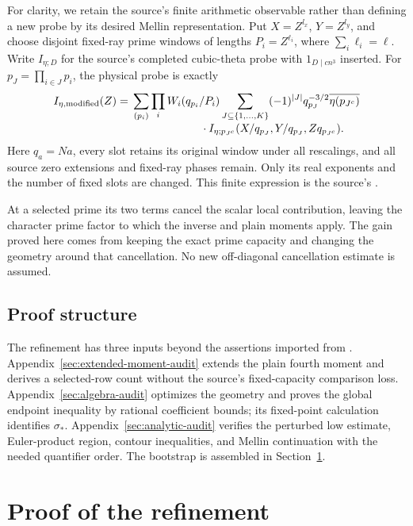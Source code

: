 \documentclass[11pt,a4paper]{article}
\numberwithin{equation}{section}
\theoremstyle{remark}
\newcommand{\src}[1]{\texttt{\detokenize{#1}}}
\begin{document}
For clarity, we retain the source's finite arithmetic observable rather
than defining a new probe by its desired Mellin representation. Put
$X=Z^{l_x}$, $Y=Z^{l_y}$, and choose disjoint fixed-ray prime windows
of lengths $P_i=Z^{\ell_i}$, where $\sum_i\ell_i=\ell$.
Write $I_{\eta;D}$ for the source's completed cubic-theta probe with
$1_{D\mid cn^3}$ inserted. For $p_J=\prod_{i\in J}p_i$, the physical
probe is exactly
\begin{align}
 I_{\eta,\mathrm{modified}}(Z)
 ={}&\sum_{(p_i)}\prod_i W_i(q_{p_i}/P_i)
 \sum_{J\subseteq\{1,\ldots,K\}}
 (-1)^{|J|}q_{p_J}^{-3/2}\overline{\eta(p_{J^c})}\notag\\[-1mm]
 &\hspace{22mm}\cdot
 I_{\eta;p_{J^c}}(X/q_{p_J},Y/q_{p_J},Zq_{p_{J^c}}).
 \label{eq:physical-probe}
\end{align}
Here $q_a=Na$, every slot retains its original window under all
rescalings, and all source zero extensions and fixed-ray phases remain.
Only its real exponents and the number of fixed slots are changed.
This finite expression is the source's
\src{eq:compensated-probe-definition}.

At a selected prime its two terms cancel the scalar local contribution,
leaving the character prime factor to which the inverse and plain
moments apply. The gain proved here comes from keeping the exact
prime capacity and changing the geometry around that cancellation.
No new off-diagonal cancellation estimate is assumed.




\subsection{Proof structure}
The refinement has three inputs beyond the assertions imported from
\cite{OA}. Appendix~\ref{sec:extended-moment-audit} extends the plain
fourth moment and derives a selected-row count without the source's
fixed-capacity comparison loss. Appendix~\ref{sec:algebra-audit}
optimizes the geometry and proves the global endpoint inequality by
rational coefficient bounds; its fixed-point calculation identifies
$\sigma_*$. Appendix~\ref{sec:analytic-audit} verifies the perturbed
low estimate, Euler-product region, contour inequalities, and Mellin
continuation with the needed quantifier order. The bootstrap is
assembled in Section~\ref{sec:assembly}.

\section{Proof of the refinement}
\label{sec:assembly}
\end{document}
